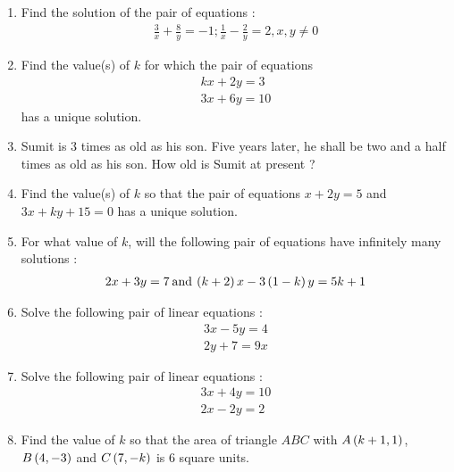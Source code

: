 \begin{enumerate}
\item Find the solution of the pair of equations :
\begin{align*}
    \frac{3}{x}+\frac{8}{y}=-1; \frac{1}{x}-\frac{2}{y}=2, x, y\neq 0
\end{align*}

\item Find the value(s) of $k$ for which the pair of equations
\begin{align*}
    kx+2y=3\\
3x+6y=10
\end{align*}
has a unique solution.
\item Sumit is $3$ times as old as his son. Five years later, he shall be two and a half times as old as his son. How old is Sumit at present ?

 \item Find the value(s) of $k$ so that the pair of equations $x + 2y = 5$ and $3x + ky + 15 = 0$ has a unique solution.

 \item For what value of $k$, will the following pair of equations have infinitely many solutions :
\begin{align*}
	2x + 3y = 7 \hspace{2pt} \text{and} \hspace{2pt} \left(k+2\right)x - 3\left(1-k\right)y = 5k+1 
\end{align*}

\item Solve the following pair of linear equations :
\begin{align*}
 3x - 5y = 4\\
2y + 7 = 9x   
\end{align*}    

\item Solve the following pair of linear equations :
\begin{align*}
 3x + 4y = 10\\
2x - 2y = 2   
\end{align*}    

\item Find the value of $k$ so that the area of triangle $ABC$ with $A\left(k + 1, 1\right)$, $B\left(4, -3\right)$ and $C\left(7, -k\right)$ is $6$ square units.

\end{enumerate}

